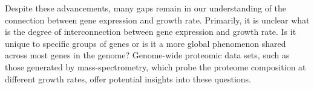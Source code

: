 Despite these advancements, many gaps remain in our understanding of the connection between gene expression and growth rate.
Primarily, it is unclear what is the degree of interconnection between gene expression and growth rate.
Is it unique to specific groups of genes or is it a more global phenomenon shared across most genes in the genome?
Genome-wide proteomic data sets, such as those generated by mass-spectrometry, which probe the proteome composition at different growth rates, offer potential insights into these questions.
